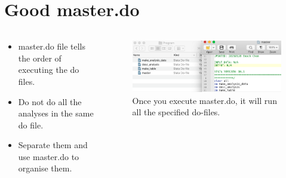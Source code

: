 \section{Good master.do}
\begin{frame}{\secname}
\begin{columns}
	\begin{column}{0.4\textwidth} 
	\begin{itemize}
	\item master.do file tells the order of executing the do files.
	\item Do not do all the analyses in the same do file. 
	\item Separate them and use master.do to organise them.
	\end{itemize}
	\end{column}
	\begin{column}{0.6\textwidth}
	\begin{figure}
			\includegraphics[scale=0.3]{image/master}
			\caption{Once you execute master.do, it will run all the specified do-files. }
	\end{figure}
	\end{column}
	\end{columns}
\end{frame}

